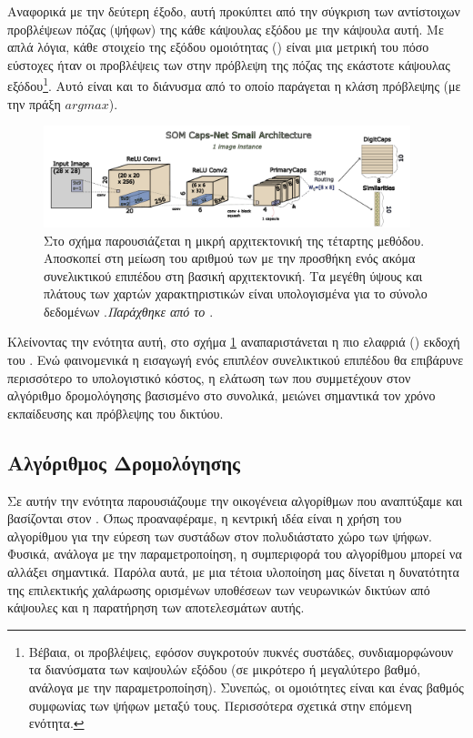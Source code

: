 Αναφορικά με την δεύτερη έξοδο, αυτή προκύπτει από την σύγκριση των αντίστοιχων προβλέψεων πόζας (ψήφων) της κάθε κάψουλας εξόδου με την κάψουλα αυτή. Με απλά λόγια, κάθε στοιχείο της εξόδου ομοιότητας () είναι μια μετρική του πόσο εύστοχες ήταν οι προβλέψεις των  στην πρόβλεψη της πόζας της εκάστοτε κάψουλας εξόδου\footnote{Βέβαια, οι προβλέψεις, εφόσον συγκροτούν πυκνές συστάδες, συν\textendash διαμορφώνουν τα διανύσματα των καψουλών εξόδου (σε μικρότερο ή μεγαλύτερο βαθμό, ανάλογα με την παραμετροποίηση). Συνεπώς, οι ομοιότητες είναι και ένας βαθμός συμφωνίας των ψήφων μεταξύ τους. Περισσότερα σχετικά στην επόμενη ενότητα.}. Αυτό είναι και το διάνυσμα από το οποίο παράγεται η κλάση πρόβλεψης (με την πράξη $argmax$).

\begin{figure}[h]
  \centering
  \includegraphics[width=0.95\textwidth]{images/chapter method/forth_method_architecture_small.pdf}
  \caption{Στο σχήμα παρουσιάζεται η μικρή αρχιτεκτονική της τέταρτης μεθόδου. Αποσκοπεί στη μείωση του αριθμού των  με την προσθήκη ενός ακόμα συνελικτικού επιπέδου στη βασική αρχιτεκτονική. Τα μεγέθη ύψους και πλάτους των χαρτών χαρακτηριστικών είναι υπολογισμένα για το σύνολο δεδομένων .\textit{Παράχθηκε από το \href{https://inkscape.org/}{}}.}
  \label{fig:method_4_architecture_small}
\end{figure}

Κλείνοντας την ενότητα αυτή, στο σχήμα \ref{fig:method_4_architecture_small} αναπαριστάνεται η πιο ελαφριά () εκδοχή του . Ενώ φαινομενικά η εισαγωγή ενός επιπλέον συνελικτικού επιπέδου θα επιβάρυνε περισσότερο το υπολογιστικό κόστος, η ελάτωση των  που συμμετέχουν στον αλγόριθμο δρομολόγησης βασισμένο στο  συνολικά, μειώνει σημαντικά τον χρόνο εκπαίδευσης και πρόβλεψης του δικτύου.


\subsection{Αλγόριθμος Δρομολόγησης}

Σε αυτήν την ενότητα παρουσιάζουμε την οικογένεια αλγορίθμων που αναπτύξαμε και βασίζονται στον . Όπως προαναφέραμε, η κεντρική ιδέα είναι η χρήση του αλγορίθμου για την εύρεση των συστάδων στον πολυδιάστατο χώρο των ψήφων. Φυσικά, ανάλογα με την παραμετροποίηση, η συμπεριφορά του αλγορίθμου μπορεί να αλλάξει σημαντικά. Παρόλα αυτά, με μια τέτοια υλοποίηση μας δίνεται η δυνατότητα της επιλεκτικής χαλάρωσης ορισμένων υποθέσεων των νευρωνικών δικτύων από κάψουλες και η παρατήρηση των αποτελεσμάτων αυτής.\par

